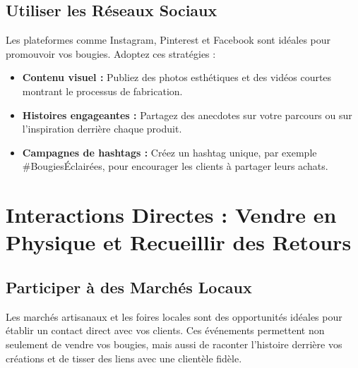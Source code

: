 \documentclass[11pt,fleqn,onecolumn,oneside]{book}
\begin{document}
\subsection*{Utiliser les Réseaux Sociaux}

Les plateformes comme Instagram, Pinterest et Facebook sont idéales pour promouvoir vos bougies. Adoptez ces stratégies :
\begin{itemize}
    \item \textbf{Contenu visuel :} Publiez des photos esthétiques et des vidéos courtes montrant le processus de fabrication.
    \item \textbf{Histoires engageantes :} Partagez des anecdotes sur votre parcours ou sur l’inspiration derrière chaque produit.
    \item \textbf{Campagnes de hashtags :} Créez un hashtag unique, par exemple \#BougiesÉclairées, pour encourager les clients à partager leurs achats.
\end{itemize}


\section{Interactions Directes : Vendre en Physique et Recueillir des Retours}

\subsection*{Participer à des Marchés Locaux}

Les marchés artisanaux et les foires locales sont des opportunités idéales pour établir un contact direct avec vos clients. Ces événements permettent non seulement de vendre vos bougies, mais aussi de raconter l’histoire derrière vos créations et de tisser des liens avec une clientèle fidèle.
\end{document}
